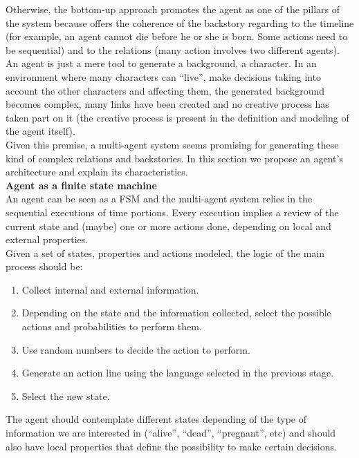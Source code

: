 \documentclass{sig-alternate}
\begin{document}
Otherwise, the bottom-up approach promotes the agent as one of the pillars of the system because offers the coherence of the backstory regarding to the timeline (for example, an agent cannot die before he or she is born. Some actions need to be sequential) and to the relations (many action involves two different agents). An agent is just a mere tool to generate a background, a character. In an environment where many characters can ``live'', make decisions taking into account the other characters and affecting them, the generated background becomes complex, many links have been created and no creative process has taken part on it (the creative process is present in the definition and modeling of the agent itself).\\

Given this premise, a multi-agent system seems promising for generating these kind of complex relations and backstories. In this section we propose an agent's architecture and explain its characteristics.\\

\textbf{Agent as a finite state machine}\\


An agent can be seen as a FSM and the multi-agent system relies in the sequential executions of time portions. Every execution implies a review of the current state and (maybe) one or more actions done, depending on local and external properties.\\

Given a set of states, properties and actions modeled, the logic of the main process should be:

\begin{enumerate}
\item Collect internal and external information.
\item Depending on the state and the information collected, select the possible actions and probabilities to perform them.
\item Use random numbers to decide the action to perform.
\item Generate an action line using the language selected in the previous stage.
\item Select the new state.
\end{enumerate}


The agent should contemplate different states depending of the type of information we are interested in (``alive'', ``dead'', ``pregnant'', etc) and should also have local properties that define the possibility to make certain decisions.
\end{document}
